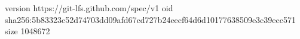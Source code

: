 version https://git-lfs.github.com/spec/v1
oid sha256:5b83323c52d74703dd09afd67cd727b24eecf64d6d10177638509e3c39ecc571
size 1048672
